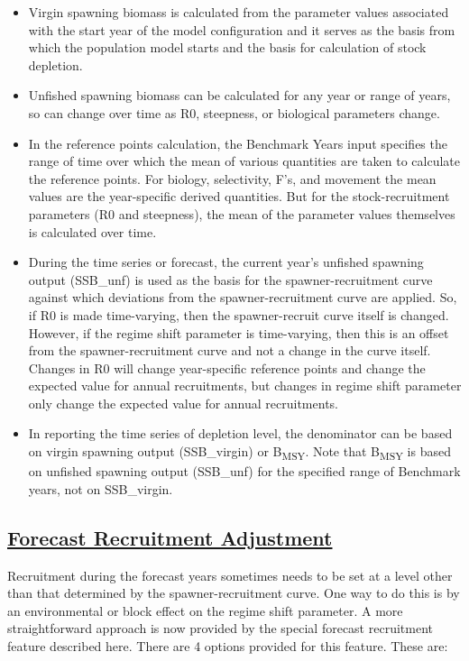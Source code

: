 \begin{itemize}
	\item Virgin spawning biomass is calculated from the parameter values associated with the start year of the model configuration and it serves as the basis from which the population model starts and the basis for calculation of stock depletion.
	
	\item Unfished spawning biomass can be calculated for any year or range of years, so can change over time as R0, steepness, or biological parameters change.
	
	\item In the reference points calculation, the Benchmark Years input specifies the range of time over which the mean of various quantities are taken to calculate the reference points. For biology, selectivity, F's, and movement the mean values are the year-specific derived quantities. But for the stock-recruitment parameters (R0 and steepness), the mean of the parameter values themselves is calculated over time.
	
	\item During the time series or forecast, the current year's unfished spawning output (SSB\_unf) is used as the basis for the spawner-recruitment curve against which deviations from the spawner-recruitment curve are applied. So, if R0 is made time-varying, then the spawner-recruit curve itself is changed. However, if the regime shift parameter is time-varying, then this is an offset from the spawner-recruitment curve and not a change in the curve itself. Changes in R0 will change year-specific reference points and change the expected value for annual recruitments, but changes in regime shift parameter only change the expected value for annual recruitments.
	
	\item In reporting the time series of depletion level, the denominator can be based on virgin spawning output (SSB\_virgin) or B\textsubscript{MSY}. Note that B\textsubscript{MSY} is based on unfished spawning output (SSB\_unf) for the specified range of Benchmark years, not on SSB\_virgin.
\end{itemize}


\hypertarget{ForeSpawn}{}
\subsection[Forecast Recruitment Adjustment]{\protect\hyperlink{ForeSpawn}{Forecast Recruitment Adjustment}}
Recruitment during the forecast years sometimes needs to be set at a level other than that determined by the spawner-recruitment curve. One way to do this is by an environmental or block effect on the regime shift parameter. A more straightforward approach is now provided by the special forecast recruitment feature described here. There are 4 options provided for this feature. These are:

